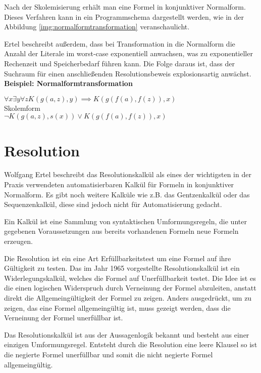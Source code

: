 Nach der Skolemisierung erhält man eine Formel in konjunktiver Normalform. Dieses Verfahren kann in ein Programmschema dargestellt werden, wie in der Abbildung \ref{img:normalformtransformation} veranschaulicht. 



Ertel beschreibt außerdem, dass bei Transformation in die Normalform die Anzahl der Literale im worst-case exponentiell anwachsen, was zu exponentieller Rechenzeit und Speicherbedarf führen kann. Die Folge daraus ist, dass der Suchraum für einen anschließenden Resolutionsbeweis explosionsartig anwächst. \cite[vgl. S.47]{GrundkursKI} \\

\textbf{Beispiel: Normalformtransformation}\\
\begin{center}
$\forall x\exists y\forall zK(g(a,z),y)\implies K(g(f(a),f(z)),x)$\\
Skolemform\\
$\neg K(g(a,z),s(x))\vee K(g(f(a),f(z)),x)$\\
\end{center}


\section{Resolution}
\label{Resolution}
Wolfgang Ertel beschreibt das Resolutionskalkül als eines der wichtigsten in der Praxis verwendeten automatisierbaren Kalkül für Formeln in konjunktiver Normalform. Es gibt noch weitere Kalküle wie z.B. das Gentzenkalkül oder das Sequenzenkalkül, diese sind jedoch nicht für Automatisierung gedacht. \cite[vgl. S.47]{GrundkursKI}

Ein Kalkül ist eine Sammlung von syntaktischen Umformungsregeln, die unter gegebenen Voraussetzungen aus bereits vorhandenen Formeln neue Formeln erzeugen.
  
Die Resolution ist ein eine Art Erfüllbarkeitstest um eine Formel auf ihre Gültigkeit zu testen. Das im Jahr 1965 vorgestellte Resolutionskalkül ist ein Widerlegungskalkül, welches die Formel auf Unerfüllbarkeit testet. Die Idee ist es die einen logischen Widerspruch durch Verneinung der Formel abzuleiten, anstatt direkt die Allgemeingültigkeit der Formel zu zeigen. Anders ausgedrückt, um zu zeigen, das eine Formel allgemeingültig ist, muss gezeigt werden, dass die Verneinung der Formel unerfüllbar ist.

Das Resolutionskalkül ist aus der Aussagenlogik bekannt und besteht aus einer einzigen Umformungsregel. Entsteht durch die Resolution eine leere Klausel so ist die negierte Formel unerfüllbar und somit die nicht negierte Formel allgemeingültig. 

